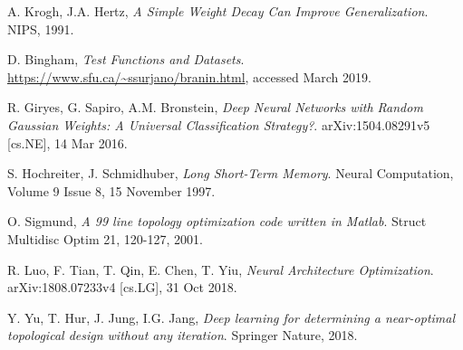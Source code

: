 \documentclass[../main.tex]{subfiles}
\begin{document}
\begin{thebibliography}{999}
  A. Krogh, J.A. Hertz,
  \emph{A Simple Weight Decay Can Improve Generalization}.
  NIPS,
  1991.

  D. Bingham,
  \emph{Test Functions and Datasets}.
  \url{https://www.sfu.ca/~ssurjano/branin.html},
  accessed March 2019.


  R. Giryes, G. Sapiro, A.M. Bronstein,
  \emph{Deep Neural Networks with Random Gaussian Weights: A Universal Classification Strategy?}.
  arXiv:1504.08291v5 [cs.NE],
  14 Mar 2016.

  S. Hochreiter, J. Schmidhuber,
  \emph{Long Short-Term Memory}.
  Neural Computation,
  Volume 9 Issue 8,
  15 November 1997.

  O. Sigmund,
  \emph{A 99 line topology optimization code written in Matlab}.
  Struct Multidisc Optim 21,
  120-127,
  2001.

  R. Luo, F. Tian, T. Qin, E. Chen, T. Yiu,
  \emph{Neural Architecture Optimization}.
  arXiv:1808.07233v4 [cs.LG],
  31 Oct 2018.

  Y. Yu, T. Hur, J. Jung, I.G. Jang,
  \emph{Deep learning for determining a near-optimal topological design without any iteration}.
  Springer Nature,
  2018.

\end{thebibliography}
\end{document}
